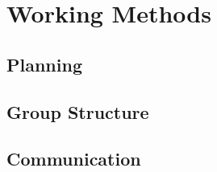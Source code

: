 \chapter{Working Methods}

\section{Planning}


\section{Group Structure}


\section{Communication}

